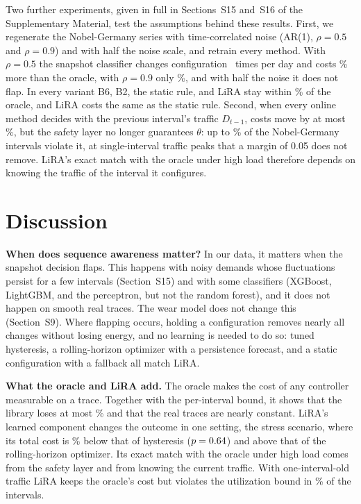 \documentclass[5p,times]{elsarticle}
\begin{document}
Two further experiments, given in full in Sections~S15 and~S16 of the Supplementary Material, test the assumptions behind these results. First, we regenerate the Nobel-Germany series with time-correlated noise (AR(1), $\rho=0.5$ and $\rho=0.9$) and with half the noise scale, and retrain every method. With $\rho=0.5$ the snapshot classifier changes configuration \nzarABfourChg\ times per day and costs \nzarAExcess\% more than the oracle, with $\rho=0.9$ only \nzarBExcess\%, and with half the noise it does not flap. In every variant B6, B2, the static rule, and LiRA stay within \nzarBLiRAgap\% of the oracle, and LiRA costs the same as the static rule. Second, when every online method decides with the previous interval's traffic $D_{t-1}$, costs move by at most \staleNobMaxDJ\%, but the safety layer no longer guarantees $\theta$: up to \staleBzerohl\% of the Nobel-Germany intervals violate it, at single-interval traffic peaks that a margin of 0.05 does not remove. LiRA's exact match with the oracle under high load therefore depends on knowing the traffic of the interval it configures.

\section{Discussion}\label{sec:discussion}

\textbf{When does sequence awareness matter?} In our data, it matters when the snapshot decision flaps. This happens with noisy demands whose fluctuations persist for a few intervals (Section~S15) and with some classifiers (XGBoost, LightGBM, and the perceptron, but not the random forest), and it does not happen on smooth real traces. The wear model does not change this (Section~S9). Where flapping occurs, holding a configuration removes nearly all changes without losing energy, and no learning is needed to do so: tuned hysteresis, a rolling-horizon optimizer with a persistence forecast, and a static configuration with a fallback all match LiRA.

\textbf{What the oracle and LiRA add.} The oracle makes the cost of any controller measurable on a trace. Together with the per-interval bound, it shows that the library loses at most \boundMaxLoss\% and that the real traces are nearly constant. LiRA's learned component changes the outcome in one setting, the stress scenario, where its total cost is \nobstGainPct\% below that of hysteresis ($p=0.64$) and above that of the rolling-horizon optimizer. Its exact match with the oracle under high load comes from the safety layer and from knowing the current traffic. With one-interval-old traffic LiRA keeps the oracle's cost but violates the utilization bound in \staleLiRAViolhl\% of the intervals.
\end{document}
